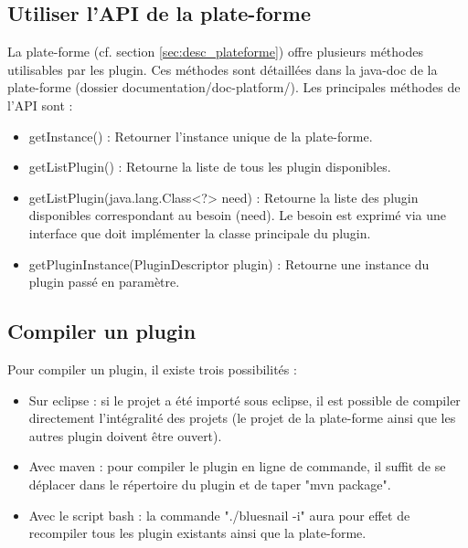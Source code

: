\subsection{Utiliser l'API de la plate-forme}

    La plate-forme (cf. section \ref{sec:desc_plateforme}) offre plusieurs méthodes utilisables par les plugin. Ces méthodes sont détaillées dans la java-doc de la plate-forme (dossier documentation/doc-platform/). Les principales méthodes de l'API sont :
    
    \begin{itemize}
        \item getInstance() : Retourner l'instance unique de la plate-forme.
        \item getListPlugin() : Retourne la liste de tous les plugin disponibles.
        \item getListPlugin(java.lang.Class<?> need) : Retourne la liste des plugin disponibles correspondant au besoin (need). Le besoin est exprimé via une interface que doit implémenter la classe principale du plugin.
        \item getPluginInstance(PluginDescriptor plugin) : Retourne une instance du plugin passé en paramètre.
    \end{itemize}

\subsection{Compiler un plugin}
    Pour compiler un plugin, il existe trois possibilités :
    \begin{itemize}
        \item Sur eclipse : si le projet a été importé sous eclipse, il est possible de compiler directement l'intégralité des projets (le projet de la plate-forme ainsi que les autres plugin doivent être ouvert).
        \item Avec maven : pour compiler le plugin en ligne de commande, il suffit de se déplacer dans le répertoire du plugin et de taper "mvn package".
        \item Avec le script bash : la commande "./bluesnail -i" aura pour effet de recompiler tous les plugin existants ainsi que la plate-forme.
    \end{itemize}
